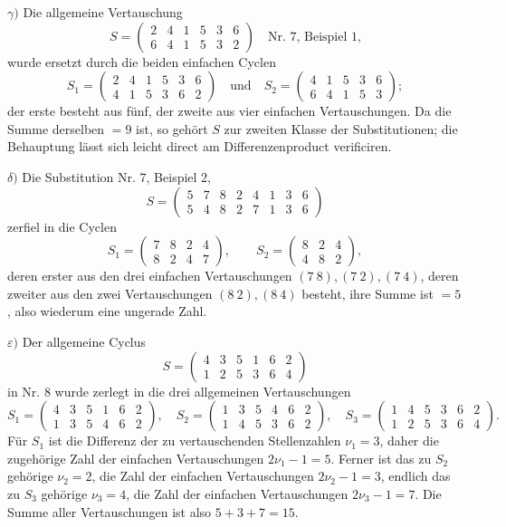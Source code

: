 \documentclass[10pt]{article}
\begin{document}
\(\gamma)\) Die allgemeine Vertauschung
\[
S=\begin{pmatrix}2&4&1&5&3&6\\6&4&1&5&3&2\end{pmatrix}\quad \text{Nr. 7, Beispiel 1,}
\]
wurde ersetzt durch die beiden einfachen Cyclen
\[
S_1=\begin{pmatrix}2&4&1&5&3&6\\4&1&5&3&6&2\end{pmatrix}
\quad\text{und}\quad
S_2=\begin{pmatrix}4&1&5&3&6\\6&4&1&5&3\end{pmatrix};
\]
der erste besteht aus fünf, der zweite aus vier einfachen Vertauschungen. Da die Summe derselben \(=9\) ist, so gehört \(S\) zur zweiten Klasse der Substitutionen; die Behauptung lässt sich leicht direct am Differenzenproduct verificiren.

\(\delta)\) Die Substitution Nr. 7, Beispiel 2,
\[
S=\begin{pmatrix}5&7&8&2&4&1&3&6\\5&4&8&2&7&1&3&6\end{pmatrix}
\]
zerfiel in die Cyclen
\[
S_1=\begin{pmatrix}7&8&2&4\\8&2&4&7\end{pmatrix},\qquad
S_2=\begin{pmatrix}8&2&4\\4&8&2\end{pmatrix},
\]
deren erster aus den drei einfachen Vertauschungen \((7\ 8),(7\ 2),(7\ 4)\), deren zweiter aus den zwei Vertauschungen \((8\ 2),(8\ 4)\) besteht, ihre Summe ist \(=5\), also wiederum eine ungerade Zahl.

\(\varepsilon)\) Der allgemeine Cyclus
\[
S=\begin{pmatrix}4&3&5&1&6&2\\1&2&5&3&6&4\end{pmatrix}
\]
in Nr. 8 wurde zerlegt in die drei allgemeinen Vertauschungen
\[
S_1=\begin{pmatrix}4&3&5&1&6&2\\1&3&5&4&6&2\end{pmatrix},\quad
S_2=\begin{pmatrix}1&3&5&4&6&2\\1&4&5&3&6&2\end{pmatrix},\quad
S_3=\begin{pmatrix}1&4&5&3&6&2\\1&2&5&3&6&4\end{pmatrix}.
\]
Für \(S_1\) ist die Differenz der zu vertauschenden Stellenzahlen \(\nu_1=3\), daher die zugehörige Zahl der einfachen Vertauschungen \(2\nu_1-1=5\). Ferner ist das zu \(S_2\) gehörige \(\nu_2=2\), die Zahl der einfachen Vertauschungen \(2\nu_2-1=3\), endlich das zu \(S_3\) gehörige \(\nu_3=4\), die Zahl der einfachen Vertauschungen \(2\nu_3-1=7\). Die Summe aller Vertauschungen ist also \(5+3+7=15\).
\end{document}
